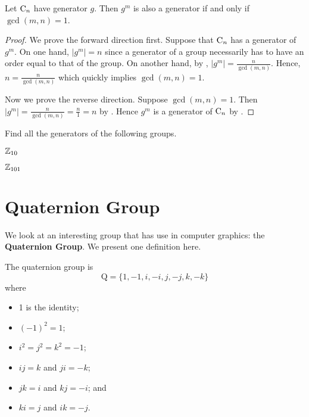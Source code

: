 \begin{corollary}\label{corollary-element-in-cyclic-group-is-generator-iff-gcd-is-1}
    Let $\mathrm{C}_{n}$ have generator $g$. Then $g^m$ is also a generator if and only if $\gcd(m, n) = 1$.
\end{corollary}
\begin{proof}
    We prove the forward direction first. Suppose that $\mathrm{C}_{n}$ has a generator of $g^m$. On one hand, $|g^m| = n$ since a generator of a group necessarily has to have an order equal to that of the group. On another hand, by , $|g^m| = \frac{n}{\gcd(m, n)}$. Hence, $n = \frac{n}{\gcd(m, n)}$ which quickly implies $\gcd(m, n) = 1$.

    Now we prove the reverse direction. Suppose $\gcd(m,n) = 1$. Then $|g^m| = \frac{n}{\gcd(m,n)} = \frac{n}{1} = n$ by . Hence $g^m$ is a generator of $\mathrm{C}_{n}$ by .
\end{proof}

\begin{exercise}
    Find all the generators of the following groups.
    \begin{partquestions}{\alph*}
        \item $\mathbb{Z}_{10}$
        \item $\mathbb{Z}_{101}$
    \end{partquestions}
\end{exercise}

\section{Quaternion Group}
We look at an interesting group that has use in computer graphics: the \textbf{Quaternion Group}. We present one definition here.
\begin{definition}\label{definition-quaternion-group}
    The quaternion group is
    \[
            \mathrm{Q} = \{1, -1, i, -i, j, -j, k, -k\}
    \]
    where
    \begin{multicols}{2}
        \begin{itemize}
            \item 1 is the identity;
            \item $(-1)^2 = 1$;
            \item $i^2 = j^2 = k^2 = -1$;
            \item $ij = k$ and $ji = -k$;
            \item $jk = i$ and $kj = -i$; and
            \item $ki = j$ and $ik = -j$.
        \end{itemize}
    \end{multicols}
\end{definition}

